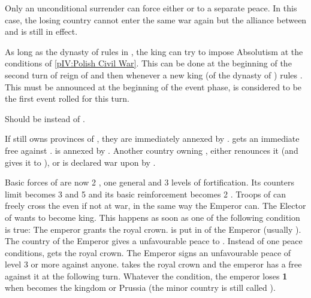 \phpaix
\aparag Only an unconditional surrender can force either \POL or \paysSaxe to
a separate peace.
\bparag In this case, the losing country cannot enter the same war again but
the alliance between \POL and \paysSaxe is still in effect.

\effetlong
\aparag As long as the dynasty of \paysSaxe rules in \POL, the king can try to
impose Absolutism at the conditions of \ref{pIV:Polish Civil War}.
\bparag This can be done at the beginning of the second turn of reign of
 and then whenever a new king (of the dynasty of
\paysSaxe) rules \POL.
\bparag This must be announced at the beginning of the event phase,
 is considered to be the first event rolled
for this turn.





\begin{todo}
  Should be \PRUpru instead of \paysBrandebourg.
\end{todo}
\phevnt
\aparag If \POLpol still owns provinces of , they are
immediately annexed by \paysBrandebourg. \POL gets an immediate free \CB
against \paysBrandebourg.
\aparag \paysBerg is annexed by \paysBrandebourg.
\bparag Another country owning \paysBerg, either renounces it (and gives it to
\paysBrandebourg), or is declared war upon by \paysBrandebourg.

\effetlong
\aparag Basic forces of \paysBrandebourg are now 2 \ARMY\faceplus, one general
and 3 levels of fortification.
\bparag Its counters limit becomes 3 \ARMY and 5 \LD and its basic
reinforcement becomes 2 \LD.
\aparag Troops of \paysBrandebourg can freely cross the \HRE even if not at
war, in the same way the Emperor can.
\aparag The Elector of \paysBrandebourg wants to become king. This happens as
soon as one of the following condition is true:
\bparag The emperor grants the royal crown. \paysBrandebourg is put in \EC of
the Emperor (usually \HAB).
\bparag The country of the Emperor gives a unfavourable peace to
\paysBrandebourg. Instead of one peace conditions, \paysBrandebourg gets the
royal crown.
\bparag The Emperor signs an unfavourable peace of level 3 or more against
anyone. \paysBrandebourg takes the royal crown and the emperor has a free \CB
against it at the following turn.
\aparag Whatever the condition, the emperor loses {\bf 1} \STAB when
\paysBrandebourg becomes the kingdom or Prussia (the minor country is still
called \paysBrandebourg).



